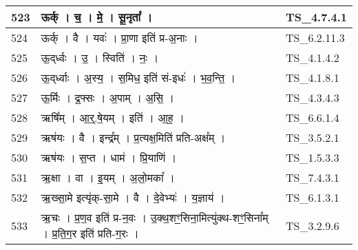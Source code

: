 \documentclass[17pt]{extarticle}
\begin{document}
\begin{longtable}{||p{0.4in}||p{4.9in}||p{0.9in}||}
    \hline
        
    523 & ऊर्क्   ।   च॒   ।   मे॒   ।   सू॒नृता᳚   ।    & TS\_4.7.4.1       \\
    
    \hline
        
    524 & ऊर्क्   ।   वै   ।   यवः॑   ।   प्रा॒णा इति॑ प्र{-}अ॒नाः   ।    & TS\_6.2.11.3       \\
    
    \hline
        
    525 & ऊ॒द्‌र्ध्वः   ।   उ॒   ।   स्विति॑   ।   नः॒   ।    & TS\_4.1.4.2       \\
    
    \hline
        
    526 & ऊ॒द्‌र्ध्वाः   ।   अ॒स्य॒   ।   स॒मिध॒ इति॑ सं{-}इधः॑   ।   भ॒व॒न्ति॒   ।    & TS\_4.1.8.1       \\
    
    \hline
        
    527 & ऊ॒र्मिः   ।   द्र॒फ्सः   ।   अ॒पाम्   ।   अ॒सि॒   ।    & TS\_4.3.4.3       \\
    
    \hline
        
    528 & ऋषि᳚म्   ।   आ॒र्॒.षे॒यम्   ।   इति॑   ।   आ॒ह॒   ।    & TS\_6.6.1.4       \\
    
    \hline
        
    529 & ऋष॑यः   ।   वै   ।   इन्द्र᳚म्   ।   प्र॒त्यक्ष॒मिति॑ प्रति{-}अक्ष᳚म्   ।    & TS\_3.5.2.1       \\
    
    \hline
        
    530 & ऋष॑यः   ।   स॒प्त   ।   धाम॑   ।   प्रि॒याणि॑   ।    & TS\_1.5.3.3       \\
    
    \hline
        
    531 & ऋ॒क्षा   ।   वा   ।   इ॒यम्   ।   अ॒लो॒मका᳚   ।    & TS\_7.4.3.1       \\
    
    \hline
        
    532 & ऋ॒ख्सा॒मे इत्यृ॑क्{-}सा॒मे   ।   वै   ।   दे॒वेभ्यः॑   ।   य॒ज्ञाय॑   ।    & TS\_6.1.3.1       \\
    
    \hline
        
    533 & ऋ॒चः   ।   प्र॒ण॒व इति॑ प्र{-}न॒वः   ।   उ॒क्थ॒शꣳ॒॒सिना॒मित्यु॑क्थ{-}शꣳ॒॒सिना᳚म्   ।   प्र॒ति॒ग॒र इति॑ प्रति{-}ग॒रः   ।    & TS\_3.2.9.6       \\
    

\end{longtable}
\end{document}
